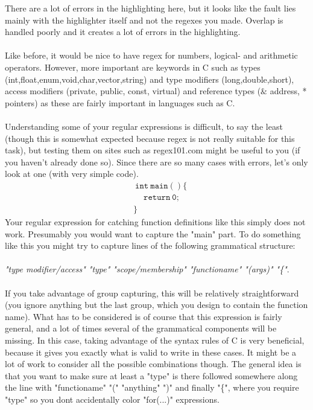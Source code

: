 \documentclass[a4paper]{article}
\begin{document}
\noindent There are a lot of errors in the highlighting here, but it looks like the fault lies mainly with the highlighter itself and not the regexes you made. Overlap is handled poorly and it creates a lot of errors in the highlighting. 
\\\\
Like before, it would be nice to have regex for numbers, logical- and arithmetic operators. However, more important are keywords in C such as types (int,float,enum,void,char,vector,string) and type modifiers (long,double,short), access modifiers (private, public, const, virtual) and reference types ($\&$ address, * pointers) as these are fairly important in languages such as C.
\\\\
Understanding some of your regular expressions is difficult, to say the least (though this is somewhat expected because regex is not really suitable for this task), but testing them on sites such as regex101.com might be useful to you (if you haven't already done so). Since there are so many cases with errors, let's only look at one (with very simple code).
\begin{align*}
&\  \mathtt{int \ main()\{}\\
&\ \quad \mathtt{return \ 0;}\\
&\mathtt{\}}
\end{align*}
Your regular expression for catching function definitions like this simply does not work. Presumably you would want to capture the "main" part. To do something like this you might try to capture lines of the following grammatical structure: 
\\\\
\textit{"type modifier/access" "type" "scope/membership" "functioname" "(args)" "\{"}. 
\\\\
If you take advantage of group capturing, this will be relatively straightforward (you ignore anything but the last group, which you design to contain the function name). What has to be considered is of course that this expression is fairly general, and a lot of times several of the grammatical components will be missing. In this case, taking advantage of the syntax rules of C is very beneficial, because it gives you exactly what is valid to write in these cases. It might be a lot of work to consider all the possible combinations though. The general idea is that you want to make sure at least a "type" is there followed somewhere along the line with "functioname" "(" "anything" ")" and finally "\{", where you require "type" so you dont accidentally color "for(...)" expressions.
\end{document}
